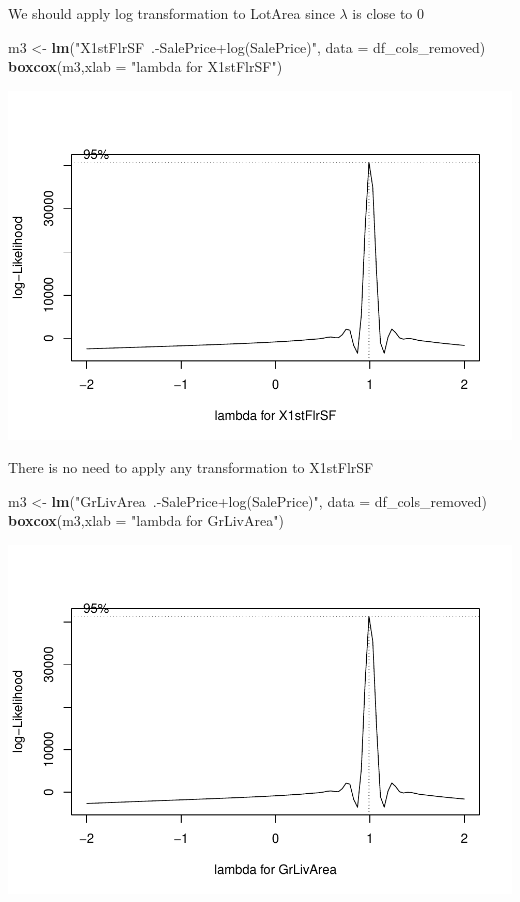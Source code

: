 \documentclass[
]{article}
\newenvironment{Shaded}{\begin{snugshade}}{\end{snugshade}}
\newcommand{\DataTypeTok}[1]{\textcolor[rgb]{0.13,0.29,0.53}{#1}}
\newcommand{\KeywordTok}[1]{\textcolor[rgb]{0.13,0.29,0.53}{\textbf{#1}}}
\newcommand{\NormalTok}[1]{#1}
\newcommand{\StringTok}[1]{\textcolor[rgb]{0.31,0.60,0.02}{#1}}
\begin{document}
We should apply log transformation to LotArea since \(\lambda\) is close to 0

\begin{Shaded}
\begin{Highlighting}[]
\NormalTok{m3 <-}\StringTok{ }\KeywordTok{lm}\NormalTok{(}\StringTok{"X1stFlrSF~.-SalePrice+log(SalePrice)"}\NormalTok{, }\DataTypeTok{data =}\NormalTok{ df_cols_removed)}
\KeywordTok{boxcox}\NormalTok{(m3,}\DataTypeTok{xlab =} \StringTok{"lambda for X1stFlrSF"}\NormalTok{)}
\end{Highlighting}
\end{Shaded}

\includegraphics{Final-Project_files/figure-latex/unnamed-chunk-19-1.pdf}

There is no need to apply any transformation to X1stFlrSF

\begin{Shaded}
\begin{Highlighting}[]
\NormalTok{m3 <-}\StringTok{ }\KeywordTok{lm}\NormalTok{(}\StringTok{"GrLivArea~.-SalePrice+log(SalePrice)"}\NormalTok{, }\DataTypeTok{data =}\NormalTok{ df_cols_removed)}
\KeywordTok{boxcox}\NormalTok{(m3,}\DataTypeTok{xlab =} \StringTok{"lambda for GrLivArea"}\NormalTok{)}
\end{Highlighting}
\end{Shaded}

\includegraphics{Final-Project_files/figure-latex/unnamed-chunk-20-1.pdf}
\end{document}
